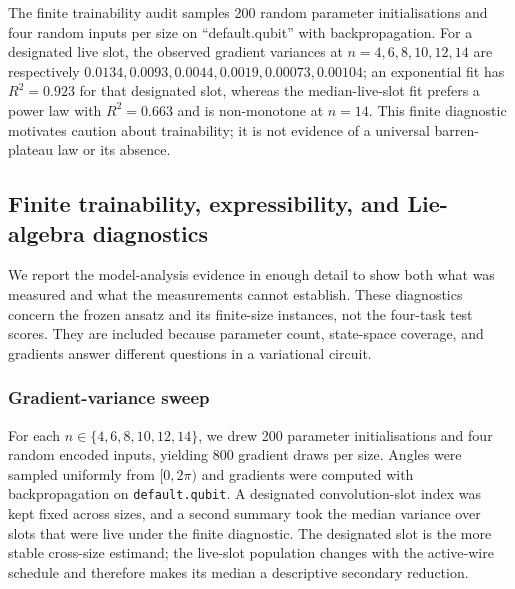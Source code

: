 \documentclass[conference]{IEEEtran}
\begin{document}
The finite trainability audit samples 200 random parameter initialisations and four random inputs per size on ``default.qubit'' with backpropagation. For a designated live slot, the observed gradient variances at $n=4,6,8,10,12,14$ are respectively $0.0134,0.0093,0.0044,0.0019,0.00073,0.00104$; an exponential fit has $R^2=0.923$ for that designated slot, whereas the median-live-slot fit prefers a power law with $R^2=0.663$ and is non-monotone at $n=14$. This finite diagnostic motivates caution about trainability; it is not evidence of a universal barren-plateau law or its absence.

\subsection{Finite trainability, expressibility, and Lie-algebra diagnostics}
\label{sec:diagnostics}
We report the model-analysis evidence in enough detail to
show both what was measured and what the measurements cannot establish. These
diagnostics concern the frozen ansatz and its finite-size instances, not the
four-task test scores. They are included because parameter count, state-space
coverage, and gradients answer different questions in a variational circuit.

\subsubsection{Gradient-variance sweep}
For each $n\in\{4,6,8,10,12,14\}$, we drew 200 parameter initialisations and
four random encoded inputs, yielding 800 gradient draws per size. Angles were
sampled uniformly from $[0,2\pi)$ and gradients were computed with backpropagation
on \texttt{default.qubit}. A designated convolution-slot index was kept fixed
across sizes, and a second summary took the median variance over slots that
were live under the finite diagnostic. The designated slot is the more stable
cross-size estimand; the live-slot population changes with the active-wire
schedule and therefore makes its median a descriptive secondary reduction.
\end{document}
